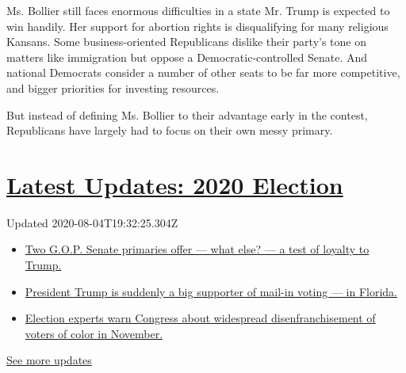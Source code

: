 Ms. Bollier still faces enormous difficulties in a state Mr. Trump is
expected to win handily. Her support for abortion rights is
disqualifying for many religious Kansans. Some business-oriented
Republicans dislike their party's tone on matters like immigration but
oppose a Democratic-controlled Senate. And national Democrats consider a
number of other seats to be far more competitive, and bigger priorities
for investing resources.

But instead of defining Ms. Bollier to their advantage early in the
contest, Republicans have largely had to focus on their own messy
primary.

\hypertarget{latest-updates-2020-election}{%
\section{\texorpdfstring{\href{https://www.nytimes3xbfgragh.onion/2020/08/04/us/elections/primary-election-michigan-arizona-kansas.html?action=click\&pgtype=Article\&state=default\&region=MAIN_CONTENT_1\&context=storylines_live_updates}{Latest
Updates: 2020
Election}}{Latest Updates: 2020 Election}}\label{latest-updates-2020-election}}

Updated 2020-08-04T19:32:25.304Z

\begin{itemize}
\tightlist
\item
  \href{https://www.nytimes3xbfgragh.onion/2020/08/04/us/elections/primary-election-michigan-arizona-kansas.html?action=click\&pgtype=Article\&state=default\&region=MAIN_CONTENT_1\&context=storylines_live_updates\#link-3924dd44}{Two
  G.O.P. Senate primaries offer --- what else? --- a test of loyalty to
  Trump.}
\item
  \href{https://www.nytimes3xbfgragh.onion/2020/08/04/us/elections/primary-election-michigan-arizona-kansas.html?action=click\&pgtype=Article\&state=default\&region=MAIN_CONTENT_1\&context=storylines_live_updates\#link-32b39e33}{President
  Trump is suddenly a big supporter of mail-in voting --- in Florida.}
\item
  \href{https://www.nytimes3xbfgragh.onion/2020/08/04/us/elections/primary-election-michigan-arizona-kansas.html?action=click\&pgtype=Article\&state=default\&region=MAIN_CONTENT_1\&context=storylines_live_updates\#link-6d019753}{Election
  experts warn Congress about widespread disenfranchisement of voters of
  color in November.}
\end{itemize}

\href{https://www.nytimes3xbfgragh.onion/2020/08/04/us/elections/primary-election-michigan-arizona-kansas.html?action=click\&pgtype=Article\&state=default\&region=MAIN_CONTENT_1\&context=storylines_live_updates}{See
more updates}

